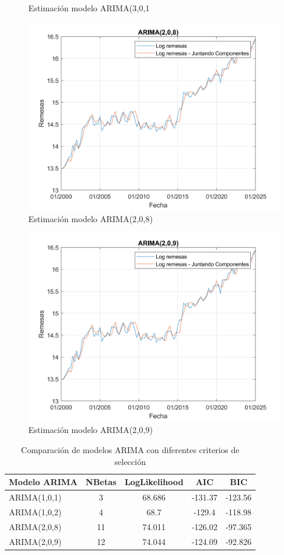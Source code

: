 \documentclass{article}
\theoremstyle{remark}
\theoremstyle{definition}
\begin{document}
\begin{enumerate}[label=\emph{\alph*})]
\begin{tcolorbox}[title=Soluci\'on 3.e]
\begin{figure}[H]
                \caption{Estimación modelo ARIMA(3,0,1}
                \label{fig:enter-label}
            \end{figure}
            \begin{figure}[H]
                \centering
                \includegraphics[width=0.5\linewidth]{docs/Arima_1_0_8.png}
                \caption{Estimación modelo ARIMA(2,0,8)}
                \label{fig:enter-label}
            \end{figure}

            \begin{figure}[H]
                \centering
                \includegraphics[width=0.5\linewidth]{docs/Arima_2_0_9.png}
                \caption{Estimación modelo ARIMA(2,0,9)}
                \label{fig:enter-label}
            \end{figure}
        \end{tcolorbox}

    \begin{table}[H]
\centering
\scriptsize
\begin{tabular}{lcccc}
\hline
\textbf{Modelo ARIMA} & \textbf{NBetas} & \textbf{LogLikelihood} & \textbf{AIC} & \textbf{BIC} \\
\hline
ARIMA(1,0,1) & 3 & 68.686 & -131.37 & -123.56 \\
ARIMA(1,0,2) & 4 & 68.7 & -129.4 & -118.98 \\
ARIMA(2,0,8) & 11 & 74.011 & -126.02 & -97.365 \\
ARIMA(2,0,9) & 12 & 74.044 & -124.09 & -92.826 \\
\hline
\end{tabular}
\caption{Comparación de modelos ARIMA con diferentes criterios de selección}
\label{tab:modelos_arima}
\end{table}
 

\end{enumerate}
\end{document}
